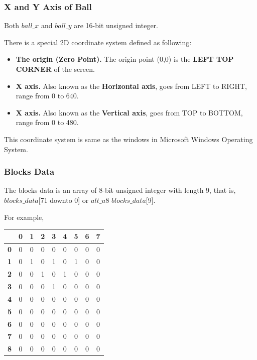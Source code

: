 \documentclass[conference]{IEEEtran}
\begin{document}
\subsubsection{X and Y Axis of Ball}
Both $ball\_x$ and $ball\_y$ are 16-bit unsigned integer.

There is a special 2D coordinate system defined as following:

\begin{itemize}
    \item \textbf{The origin (Zero Point).} The origin point (0,0) is the \textbf{LEFT TOP CORNER} of the screen.
    \item \textbf{X axis.} Also known as the \textbf{Horizontal axis}, goes from LEFT to RIGHT, range from 0 to 640.
    \item \textbf{X axis.} Also known as the \textbf{Vertical axis}, goes from TOP to BOTTOM, range from 0 to 480.
\end{itemize}

This coordinate system is same as the windows in Microsoft Windows Operating System.


\subsubsection{Blocks Data}
The blocks data is an array of 8-bit unsigned integer with length 9, that is, $blocks\_data$[71 downto 0] or $alt\_u8$ $blocks\_data$[9].

For example,

\begin{center}
\begin{tabular}{c|c|c|c|c|c|c|c|c}
      & \textbf{0} & \textbf{1} & \textbf{2} & 
      \textbf{3} & \textbf{4} & \textbf{5} &
      \textbf{6} & \textbf{7} \\ 
    \hline
    \textbf{0} & 0 & 0 & 0 & 0 & 0 & 0 & 0 & 0 \\
    \hline
    \textbf{1} & 0 & 1 & 0 & 1 & 0 & 1 & 0 & 0 \\
    \hline
    \textbf{2} & 0 & 0 & 1 & 0 & 1 & 0 & 0 & 0 \\
    \hline
    \textbf{3} & 0 & 0 & 0 & 1 & 0 & 0 & 0 & 0 \\
    \hline
    \textbf{4} & 0 & 0 & 0 & 0 & 0 & 0 & 0 & 0 \\
    \hline
    \textbf{5} & 0 & 0 & 0 & 0 & 0 & 0 & 0 & 0 \\
    \hline
    \textbf{6} & 0 & 0 & 0 & 0 & 0 & 0 & 0 & 0 \\
    \hline
    \textbf{7} & 0 & 0 & 0 & 0 & 0 & 0 & 0 & 0 \\
    \hline
    \textbf{8} & 0 & 0 & 0 & 0 & 0 & 0 & 0 & 0
\end{tabular}        
\end{center}
\end{document}
